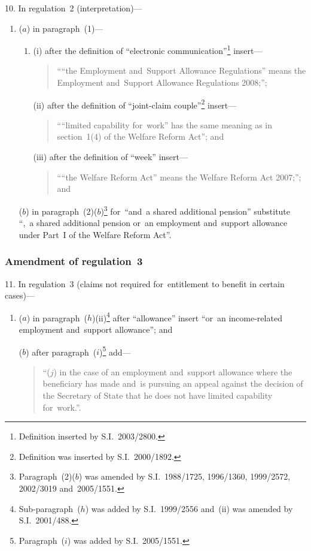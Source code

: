 \documentclass[12pt,a4paper]{article}
\begin{document}
10.  In regulation~2 (interpretation)—
\begin{enumerate}\item[]
($a$) in paragraph~(1)—
\begin{enumerate}\item[]
(i) after the definition of “electronic communication”\footnote{Definition inserted by S.I.~2003/2800.} insert—
\begin{quotation}
““the Employment and~Support Allowance Regulations” means the Employment and~Support Allowance Regulations 2008;”;
\end{quotation}

(ii) after the definition of “joint-claim couple”\footnote{Definition was inserted by S.I.~2000/1892.} insert—
\begin{quotation}
““limited capability for~work” has the same meaning as in section~1(4) of the Welfare Reform Act”; and
\end{quotation}

(iii) after the definition of “week” insert—
\begin{quotation}
““the Welfare Reform Act” means the Welfare Reform Act 2007;”; and
\end{quotation}
\end{enumerate}

($b$) in paragraph~(2)($b$)\footnote{Paragraph~(2)($b$) was amended by S.I.~1988/1725, 1996/1360, 1999/2572, 2002/3019 and~2005/1551.} for~“and~a shared additional pension” substitute “,~a shared additional pension or~an employment and~support allowance under Part~I of the Welfare Reform Act”.
\end{enumerate}

\subsubsection[11. Amendment of regulation~3]{Amendment of regulation~3}

11.  In regulation~3 (claims not required for~entitlement to benefit in certain cases)—
\begin{enumerate}\item[]
($a$) in paragraph~($h$)(ii)\footnote{Sub-paragraph~($h$) was added by S.I.~1999/2556 and~(ii) was amended by S.I.~2001/488.} after “allowance” insert “or~an income-related employment and~support allowance”; and

($b$) after paragraph~($i$)\footnote{Paragraph~($i$) was added by S.I.~2005/1551.} add—
\begin{quotation}
“($j$) in the case of an employment and~support allowance where the beneficiary has made and~is pursuing an appeal against the decision of the Secretary of State that he does not have limited capability for~work.”.
\end{quotation}
\end{enumerate}
\end{document}
